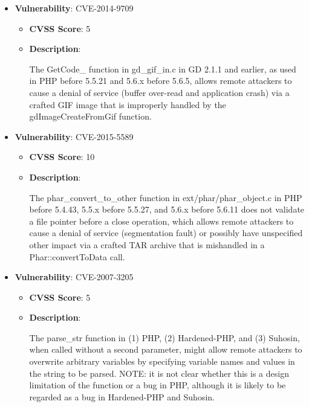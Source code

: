 \documentclass{article}
\begin{document}
\begin{itemize}
        \item \textbf{Vulnerability}: CVE-2014-9709
        \begin{itemize}
            \item \textbf{CVSS Score}:  5 
            \item \textbf{Description}:
            \parbox[t]{0.9\linewidth}{
                \ttfamily The GetCode\_ function in gd\_gif\_in.c in GD 2.1.1 and earlier, as used in PHP before 5.5.21 and 5.6.x before 5.6.5, allows remote attackers to cause a denial of service (buffer over-read and application crash) via a crafted GIF image that is improperly handled by the gdImageCreateFromGif function.
            }
        \end{itemize}
    
        \item \textbf{Vulnerability}: CVE-2015-5589
        \begin{itemize}
            \item \textbf{CVSS Score}:  10 
            \item \textbf{Description}:
            \parbox[t]{0.9\linewidth}{
                \ttfamily The phar\_convert\_to\_other function in ext/phar/phar\_object.c in PHP before 5.4.43, 5.5.x before 5.5.27, and 5.6.x before 5.6.11 does not validate a file pointer before a close operation, which allows remote attackers to cause a denial of service (segmentation fault) or possibly have unspecified other impact via a crafted TAR archive that is mishandled in a Phar::convertToData call.
            }
        \end{itemize}
    
        \item \textbf{Vulnerability}: CVE-2007-3205
        \begin{itemize}
            \item \textbf{CVSS Score}:  5 
            \item \textbf{Description}:
            \parbox[t]{0.9\linewidth}{
                \ttfamily The parse\_str function in (1) PHP, (2) Hardened-PHP, and (3) Suhosin, when called without a second parameter, might allow remote attackers to overwrite arbitrary variables by specifying variable names and values in the string to be parsed.  NOTE: it is not clear whether this is a design limitation of the function or a bug in PHP, although it is likely to be regarded as a bug in Hardened-PHP and Suhosin.
            }
        \end{itemize}
    

\end{itemize}
\end{document}
